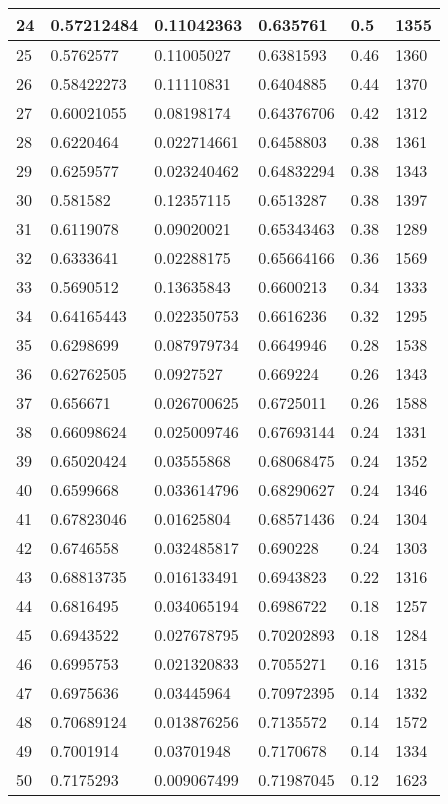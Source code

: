 \begin{longtable}{|l|l|l|l|l|l|}
24 & 0.57212484 & 0.11042363 & 0.635761 & 0.5 & 1355 \\ \hline 
25 & 0.5762577 & 0.11005027 & 0.6381593 & 0.46 & 1360 \\ \hline 
26 & 0.58422273 & 0.11110831 & 0.6404885 & 0.44 & 1370 \\ \hline 
27 & 0.60021055 & 0.08198174 & 0.64376706 & 0.42 & 1312 \\ \hline 
28 & 0.6220464 & 0.022714661 & 0.6458803 & 0.38 & 1361 \\ \hline 
29 & 0.6259577 & 0.023240462 & 0.64832294 & 0.38 & 1343 \\ \hline 
30 & 0.581582 & 0.12357115 & 0.6513287 & 0.38 & 1397 \\ \hline 
31 & 0.6119078 & 0.09020021 & 0.65343463 & 0.38 & 1289 \\ \hline 
32 & 0.6333641 & 0.02288175 & 0.65664166 & 0.36 & 1569 \\ \hline 
33 & 0.5690512 & 0.13635843 & 0.6600213 & 0.34 & 1333 \\ \hline 
34 & 0.64165443 & 0.022350753 & 0.6616236 & 0.32 & 1295 \\ \hline 
35 & 0.6298699 & 0.087979734 & 0.6649946 & 0.28 & 1538 \\ \hline 
36 & 0.62762505 & 0.0927527 & 0.669224 & 0.26 & 1343 \\ \hline 
37 & 0.656671 & 0.026700625 & 0.6725011 & 0.26 & 1588 \\ \hline 
38 & 0.66098624 & 0.025009746 & 0.67693144 & 0.24 & 1331 \\ \hline 
39 & 0.65020424 & 0.03555868 & 0.68068475 & 0.24 & 1352 \\ \hline 
40 & 0.6599668 & 0.033614796 & 0.68290627 & 0.24 & 1346 \\ \hline 
41 & 0.67823046 & 0.01625804 & 0.68571436 & 0.24 & 1304 \\ \hline 
42 & 0.6746558 & 0.032485817 & 0.690228 & 0.24 & 1303 \\ \hline 
43 & 0.68813735 & 0.016133491 & 0.6943823 & 0.22 & 1316 \\ \hline 
44 & 0.6816495 & 0.034065194 & 0.6986722 & 0.18 & 1257 \\ \hline 
45 & 0.6943522 & 0.027678795 & 0.70202893 & 0.18 & 1284 \\ \hline 
46 & 0.6995753 & 0.021320833 & 0.7055271 & 0.16 & 1315 \\ \hline 
47 & 0.6975636 & 0.03445964 & 0.70972395 & 0.14 & 1332 \\ \hline 
48 & 0.70689124 & 0.013876256 & 0.7135572 & 0.14 & 1572 \\ \hline 
49 & 0.7001914 & 0.03701948 & 0.7170678 & 0.14 & 1334 \\ \hline 
50 & 0.7175293 & 0.009067499 & 0.71987045 & 0.12 & 1623 \\ \hline 
\end{longtable}